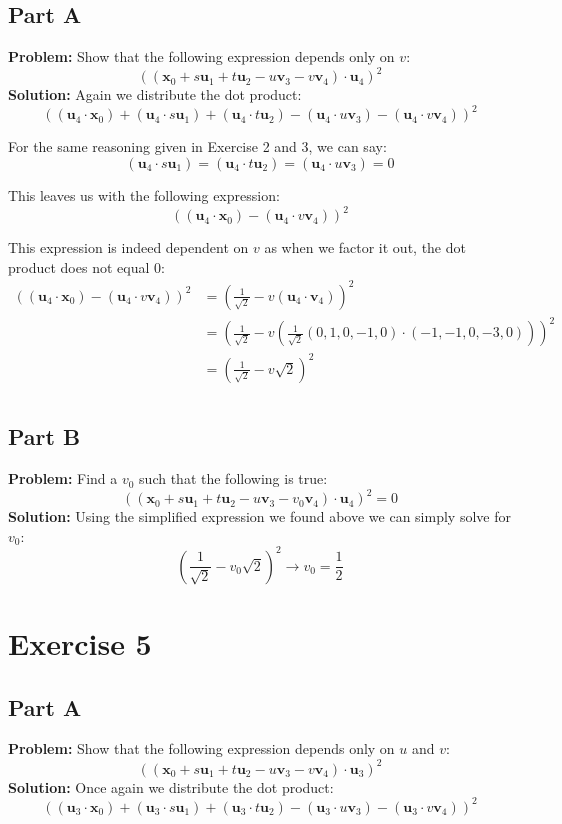 \documentclass{article}
\begin{document}
\subsection*{Part A}
\textbf{Problem:} Show that the following expression depends only on $v$:
$$((\mathbf x_0+s\mathbf u_1+t\mathbf u_2-u\mathbf v_3-v\mathbf v_4)\cdot\mathbf u_4)^2$$
\textbf{Solution:} Again we distribute the dot product:
$$((\mathbf u_4\cdot\mathbf x_0)+(\mathbf u_4\cdot s\mathbf u_1)+(\mathbf u_4\cdot t\mathbf u_2)-(\mathbf u_4\cdot u\mathbf v_3)-(\mathbf u_4\cdot v\mathbf v_4))^2$$

For the same reasoning given in Exercise 2 and 3, we can say:
$$(\mathbf u_4\cdot s\mathbf u_1)=(\mathbf u_4\cdot t\mathbf u_2)=(\mathbf u_4\cdot u\mathbf v_3)=0$$

This leaves us with the following expression:
$$((\mathbf u_4\cdot\mathbf x_0)-(\mathbf u_4\cdot v\mathbf v_4))^2$$

This expression is indeed dependent on $v$ as when we factor it out, the dot product does not equal 0:
\begin{align*}
  ((\mathbf u_4\cdot\mathbf x_0)-(\mathbf u_4\cdot v\mathbf v_4))^2&=\left(\frac{1}{\sqrt 2}-v(\mathbf u_4\cdot \mathbf v_4)\right)^2\\
  &=\left(\frac{1}{\sqrt 2}-v\left(\frac{1}{\sqrt 2}(0,1,0,-1,0)\cdot(-1, -1, 0, -3, 0)\right)\right)^2\\
  &=\left(\frac{1}{\sqrt 2}-v\sqrt 2\right)^2\\
\end{align*}
\subsection*{Part B}
\textbf{Problem:} Find a $v_0$ such that the following is true:
$$((\mathbf x_0+s\mathbf u_1+t\mathbf u_2-u\mathbf v_3-v_0\mathbf v_4)\cdot\mathbf u_4)^2=0$$
\textbf{Solution:} Using the simplified expression we found above we can simply solve for $v_0$:
$$\left(\frac{1}{\sqrt 2}-v_0\sqrt 2\right)^2\rightarrow \boxed{v_0=\frac{1}{2}}$$

\section*{Exercise 5}
\subsection*{Part A}
\textbf{Problem:} Show that the following expression depends only on $u$ and $v$:
$$((\mathbf x_0+s\mathbf u_1+t\mathbf u_2-u\mathbf v_3-v\mathbf v_4)\cdot\mathbf u_3)^2$$
\textbf{Solution:} Once again we distribute the dot product:
$$((\mathbf u_3\cdot\mathbf x_0)+(\mathbf u_3\cdot s\mathbf u_1)+(\mathbf u_3\cdot t\mathbf u_2)-(\mathbf u_3\cdot u\mathbf v_3)-(\mathbf u_3\cdot v\mathbf v_4))^2$$
\end{document}
